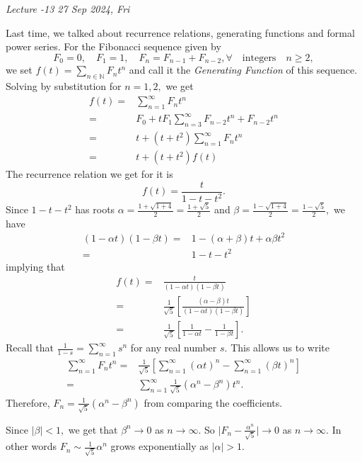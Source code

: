 
\noindent
\emph{Lecture -13 \hfill 27 Sep 2024, Fri}

Last time, we talked about recurrence relations, generating functions and formal power series.
For the Fibonacci sequence given by
$$ F_0 = 0, \quad F_1 = 1, \quad F_n = F_{n-1} + F_{n-2}, \forall \quad \text{integers} 
\quad n \geq 2,$$
we set $f(t) = \sum_{n \in \mathbb{N}}^{} F_n t^n$ and call it the \emph{Generating Function}
of this sequence.
Solving by substitution for $n=1,2,$ we get
\begin{align*}
	f(t) ={}& \sum_{n=1}^{\infty} F_n t^n \\
	={}& F_0 + t F_1 \sum_{n=3}^{\infty} F_{n-2} t^n + F_{n-2} t^n \\
	={}& t + (t + t^2) \sum_{n=1}^{\infty} F_{n} t^n \\
	={}& t + (t + t^2) f(t)
\end{align*}
The recurrence relation we get for it is
$$ f(t) =  \frac{t}{1 - t - t^2}.$$
Since $ 1 - t - t^2$ has roots 
$\alpha = \frac{1 + \sqrt{1 + 4}}{2} = \frac{1 + \sqrt{5}}{2}$ and 
$\beta = \frac{1 - \sqrt{1 +4 }}{2} = \frac{1 - \sqrt{5}}{2},$ 
we have
\begin{align*}
	( 1 - \alpha t)(1 - \beta t) ={}& 1 - (\alpha + \beta) t + \alpha \beta t^2\\
	={}& 1 - t - t^2 
\end{align*}
implying that
\begin{align*}
	f(t) ={}& \frac{t}{(1 - \alpha t ) ( 1 - \beta t)} \\
	={}& \frac{1}{\sqrt{5}} \left[  \frac{( \alpha - \beta ) t}{
	(1 - \alpha t)(1 - \beta t) }\right] \\
	={}& \frac{1}{ \sqrt{5}} \left[ \frac{1}{1 - \alpha t} - \frac{1}{ 1 - \beta t} \right].
\end{align*}
Recall that $ \frac{1}{1-s} = \sum_{n=1}^{\infty} s ^n$ for any real number $s.$
This allows us to write
\begin{align*}
	\sum_{n=1}^{\infty} F_n t^n ={}& \frac{1}{\sqrt{5}} \left[ \sum_{n=1}^{\infty} 
	(\alpha t)^n - \sum_{n=1}^{\infty} ( \beta t)^n \right] \\
	={}& \sum_{n=1}^{\infty} \frac{1}{\sqrt{5}} \left( \alpha^n - \beta^n \right) t^n.
\end{align*}
Therefore, $F_n = \frac{1}{\sqrt{5}} \left( \alpha^n  -\beta^n \right)$
from comparing the coefficients.

Since $ \lvert  \beta \rvert < 1,$ we get that $ \beta^n \to 0$ as $ n \to \infty.$
So $ \lvert  F_n - \frac{\alpha^n}{\sqrt{5}} \rvert \to 0$ as $n \to \infty.$
In other words $F_n \sim \frac{1}{\sqrt{5}} \alpha^n$ grows exponentially as $ \lvert 
\alpha\rvert >1.$


